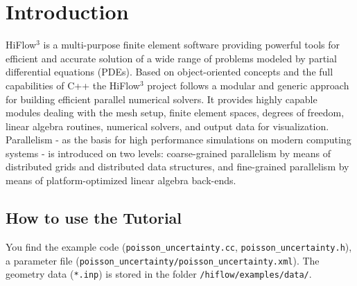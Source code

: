\documentclass{article}
\begin{document}
\renewcommand{\contentsname}{Contents}

{\parskip 0pt\tableofcontents} %



\graphicspath{{Bilder/}}

\renewcommand{\contentsname}{Introduction}

\pagebreak


\section{Introduction}

HiFlow$^\text{3}$ is a multi-purpose finite element software providing powerful tools for efficient and accurate solution of a wide range of problems modeled by partial differential equations (PDEs). Based on object-oriented concepts and the full capabilities of C++ the HiFlow$^\text{3}$  project follows a modular and generic approach for building efficient parallel numerical solvers. It provides highly capable modules dealing with the mesh setup, finite element spaces, degrees of freedom, linear algebra routines, numerical solvers, and output data for visualization. Parallelism - as the basis for high performance simulations on modern computing systems - is introduced on two levels: coarse-grained parallelism by means of distributed grids and distributed data structures, and fine-grained parallelism by means of platform-optimized linear algebra back-ends.

\subsection{How to use the Tutorial}

You find the example code (\texttt{poisson\_uncertainty.cc}, \texttt{poisson\_uncertainty.h}), a
parameter file (\texttt{poisson\_uncertainty/poisson\_uncertainty.xml}). The geometry data (\texttt{*.inp}) is stored in the
folder \texttt{/hiflow/examples/data/}.
\end{document}
